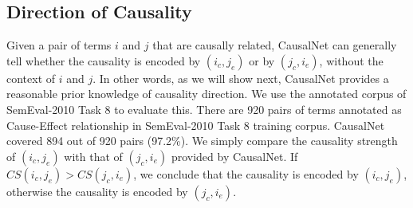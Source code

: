 \subsection{Direction of Causality}
%
%
Given a pair of terms $i$ and $j$ that are causally related,
CausalNet can generally tell whether the causality is encoded by $(i_c,j_e)$ 
or by $(j_c,i_e)$, without the context of
$i$ and $j$. In other words, as we will show next, CausalNet
provides a reasonable prior knowledge of causality direction.
We use the annotated corpus of SemEval-2010 Task 8 to evaluate this.
There are 920 pairs of terms annotated as Cause-Effect relationship in
SemEval-2010 Task 8 training corpus. CausalNet covered 894 out of
920 pairs (97.2\%). 
We simply compare the causality strength of
$(i_c,j_e)$ with that of $(j_c,i_e)$ provided by
CausalNet. If $CS(i_c,j_e) > CS(j_c,i_e)$, we
conclude that the causality is encoded by $(i_c,j_e)$,
otherwise the causality is encoded by $(j_c,i_e)$. 

